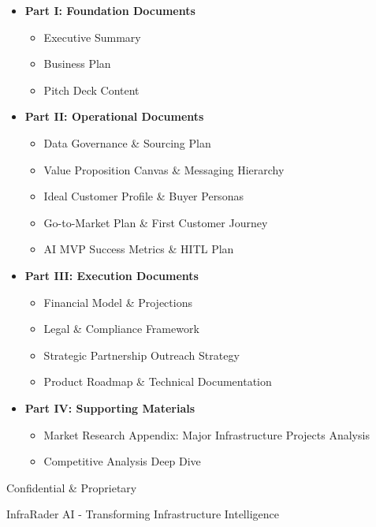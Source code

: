 \documentclass[11pt,a4paper]{book}
\begin{document}
\begin{titlepage}
    \begin{minipage}{0.8\textwidth}
    \small
    \begin{itemize}[leftmargin=*,noitemsep,topsep=0pt]
        \item \textbf{Part I: Foundation Documents}
        \begin{itemize}[leftmargin=*,noitemsep,topsep=0pt]
            \item Executive Summary
            \item Business Plan
            \item Pitch Deck Content
        \end{itemize}
        \item \textbf{Part II: Operational Documents}
        \begin{itemize}[leftmargin=*,noitemsep,topsep=0pt]
            \item Data Governance \& Sourcing Plan
            \item Value Proposition Canvas \& Messaging Hierarchy
            \item Ideal Customer Profile \& Buyer Personas
            \item Go-to-Market Plan \& First Customer Journey
            \item AI MVP Success Metrics \& HITL Plan
        \end{itemize}
        \item \textbf{Part III: Execution Documents}
        \begin{itemize}[leftmargin=*,noitemsep,topsep=0pt]
            \item Financial Model \& Projections
            \item Legal \& Compliance Framework
            \item Strategic Partnership Outreach Strategy
            \item Product Roadmap \& Technical Documentation
        \end{itemize}
        \item \textbf{Part IV: Supporting Materials}
        \begin{itemize}[leftmargin=*,noitemsep,topsep=0pt]
            \item Market Research Appendix: Major Infrastructure Projects Analysis
            \item Competitive Analysis Deep Dive
        \end{itemize}
    \end{itemize}
    \end{minipage}
    
    \vfill
    
    {\large \@author}\par
    \vspace{0.5cm}
    {\large \@date}\par
    \vspace{1cm}
    
    {\color{InfraRaderLightGrey}\small Confidential \& Proprietary}\par
    {\color{InfraRaderLightGrey}\small InfraRader AI - Transforming Infrastructure Intelligence}\par
\end{titlepage}
\end{document}
